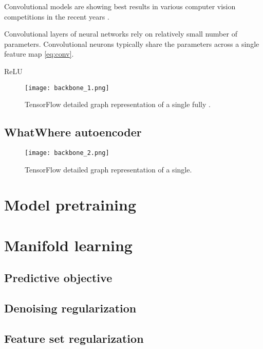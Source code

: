 Convolutional models are showing best results in various computer vision competitions in the recent years \cite{ILSVRC15, Zhou2016}.

Convolutional layers of neural networks rely on relatively small number of parameters.
Convolutional neurons typically share the parameters across a single feature map \ref{eq:conv}.



ReLU \cite{Nair2010}

\begin{figure}[h!]
  \centering
    \texttt{[image: backbone\_1.png]}
  \caption{TensorFlow detailed graph representation of a single fully .}
  \label{fig:tf_graph}
\end{figure}

\subsection{WhatWhere autoencoder}

\begin{figure}[h!]
  \centering
    \texttt{[image: backbone\_2.png]}
  \caption{TensorFlow detailed graph representation of a single.}
  \label{fig:tf_graph}
\end{figure}

\section{Model pretraining}



\section{Manifold learning}\label{ss:mf}
\subsection{Predictive objective}
\subsection{Denoising regularization}
\subsection{Feature set regularization}
